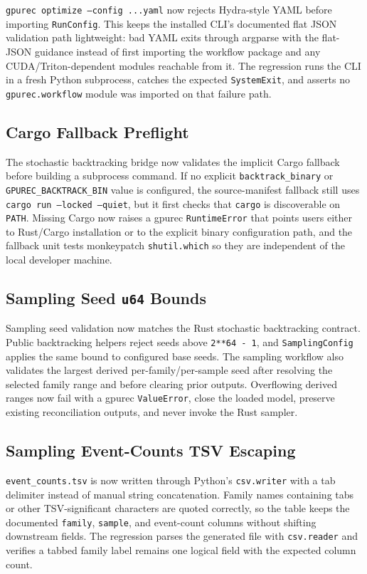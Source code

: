 \documentclass[11pt]{article}
\begin{document}
\texttt{gpurec optimize --config ...yaml} now rejects Hydra-style YAML before
importing \texttt{RunConfig}.  This keeps the installed CLI's documented flat
JSON validation path lightweight: bad YAML exits through argparse with the
flat-JSON guidance instead of first importing the workflow package and any
CUDA/Triton-dependent modules reachable from it.  The regression runs the CLI
in a fresh Python subprocess, catches the expected \texttt{SystemExit}, and
asserts no \texttt{gpurec.workflow} module was imported on that failure path.

\subsection{Cargo Fallback Preflight}

The stochastic backtracking bridge now validates the implicit Cargo fallback
before building a subprocess command.  If no explicit
\texttt{backtrack\_binary} or \texttt{GPUREC\_BACKTRACK\_BIN} value is
configured, the source-manifest fallback still uses
\texttt{cargo run --locked --quiet}, but it first checks that
\texttt{cargo} is discoverable on \texttt{PATH}.  Missing Cargo now raises a
gpurec \texttt{RuntimeError} that points users either to Rust/Cargo
installation or to the explicit binary configuration path, and the fallback
unit tests monkeypatch \texttt{shutil.which} so they are independent of the
local developer machine.

\subsection{Sampling Seed \texttt{u64} Bounds}

Sampling seed validation now matches the Rust stochastic backtracking contract.
Public backtracking helpers reject seeds above \texttt{2**64 - 1}, and
\texttt{SamplingConfig} applies the same bound to configured base seeds.  The
sampling workflow also validates the largest derived per-family/per-sample seed
after resolving the selected family range and before clearing prior outputs.
Overflowing derived ranges now fail with a gpurec \texttt{ValueError}, close
the loaded model, preserve existing reconciliation outputs, and never invoke
the Rust sampler.

\subsection{Sampling Event-Counts TSV Escaping}

\texttt{event\_counts.tsv} is now written through Python's
\texttt{csv.writer} with a tab delimiter instead of manual string
concatenation.  Family names containing tabs or other TSV-significant
characters are quoted correctly, so the table keeps the documented
\texttt{family}, \texttt{sample}, and event-count columns without shifting
downstream fields.  The regression parses the generated file with
\texttt{csv.reader} and verifies a tabbed family label remains one logical
field with the expected column count.
\end{document}
